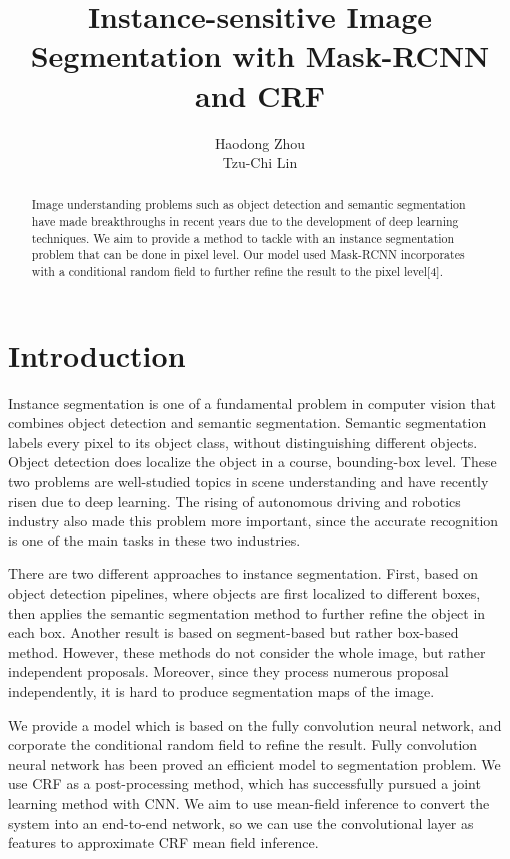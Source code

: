 \documentclass{article}
\title{Instance-sensitive Image Segmentation with Mask-RCNN and CRF}
\author{
  Haodong Zhou \\
  \And
  Tzu-Chi Lin \\
}
\begin{document}

\maketitle

\begin{abstract}

Image understanding problems such as object detection and semantic segmentation have made breakthroughs in recent years due to the development of deep learning techniques. We aim to provide a method to tackle with an instance segmentation problem that can be done in pixel level. Our model used Mask-RCNN incorporates with a conditional random field to further refine the result to the pixel level[4].

\end{abstract}

\section{Introduction}

Instance segmentation is one of a fundamental problem in computer vision that combines object detection and semantic segmentation. Semantic segmentation labels every pixel to its object class, without distinguishing different objects. Object detection does localize the object in a course, bounding-box level. These two problems are well-studied topics in scene understanding and have recently risen due to deep learning. The rising of autonomous driving and robotics industry also made this problem more important, since the accurate recognition is one of the main tasks in these two industries.

There are two different approaches to instance segmentation. First, based on object detection pipelines, where objects are first localized to different boxes, then applies the semantic segmentation method to further refine the object in each box. Another result is based on segment-based but rather box-based method. However, these methods do not consider the whole image, but rather independent proposals. Moreover, since they process numerous proposal independently, it is hard to produce segmentation maps of the image.

We provide a model which is based on the fully convolution neural network, and corporate the conditional random field to refine the result. Fully convolution neural network has been proved an efficient model to segmentation problem. We use CRF as a post-processing method, which has successfully pursued a joint learning method with CNN. We aim to use mean-field inference to convert the system into an end-to-end network, so we can use the convolutional layer as features to approximate CRF mean field inference.
\end{document}
